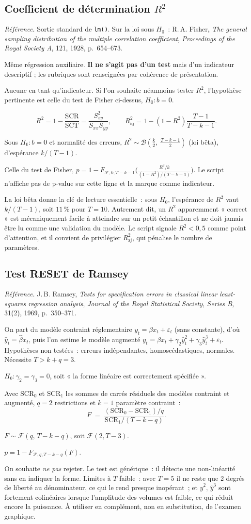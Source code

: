\documentclass[a4paper,11pt]{article}
\newcommand{\code}[1]{\texttt{\small #1}}
\newcommand{\refl}[1]{{\small\textcolor{maincolor!70!black}{\textit{Référence.} #1}}\par\smallskip}
\newcounter{ficheid}
\newenvironment{fiche}[1]{%
  \stepcounter{ficheid}%
  \phantomsection
  \subsection{#1}%
  \label{fiche:\theficheid}%
}{%
  \end{description}\vspace{0.5em}%
}
\newcommand{\Cadre}{%
  \begin{description}[leftmargin=0pt, style=unboxed, itemsep=3pt, topsep=3pt, parsep=2pt]%
  \item[\textcolor{financeblue}{\textbf{1. Cadre, notations et hypothèses de validité (non testées).}}]}
\newcommand{\Hzero}{\item[\textcolor{financeblue}{\textbf{2. Hypothèse nulle.}}]}
\newcommand{\Stat}{\item[\textcolor{financeblue}{\textbf{3. Statistique de test.}}]}
\newcommand{\Loi}{\item[\textcolor{financeblue}{\textbf{4. Loi sous $H_0$.}}]}
\newcommand{\Pval}{\item[\textcolor{financeblue}{\textbf{5. p-value.}}]}
\newcommand{\Usage}{\item[\textcolor{financeblue}{\textbf{6. Usage et limites.}}]}
\begin{document}
\begin{fiche}{Coefficient de détermination $R^2$}
\refl{Sortie standard de \code{lm()}. Sur la loi sous $H_0$~: R.\,A. Fisher, \emph{The general
sampling distribution of the multiple correlation coefficient}, \emph{Proceedings of the Royal
Society A}, 121, 1928, p.~654--673.}
\Cadre
Même régression auxiliaire. \textbf{Il ne s'agit pas d'un test} mais d'un indicateur descriptif ;
les rubriques sont renseignées par cohérence de présentation.
\Hzero
Aucune en tant qu'indicateur. Si l'on souhaite néanmoins tester $R^2$, l'hypothèse pertinente est
celle du test de Fisher ci-dessus, $H_0 : b = 0$.
\Stat
\[
  R^2 = 1 - \frac{\mathrm{SCR}}{\mathrm{SCT}} = \frac{S_{xy}^2}{S_{xx}S_{yy}},
  \qquad
  R^2_{\text{aj}} = 1 - (1-R^2)\frac{T-1}{T-k-1}.
\]
\Loi
Sous $H_0 : b = 0$ et normalité des erreurs,
$R^2 \sim \mathcal{B}\!\left(\tfrac{k}{2},\ \tfrac{T-k-1}{2}\right)$ (loi bêta), d'espérance
$k/(T-1)$.
\Pval
Celle du test de Fisher,
$p = 1 - F_{\mathcal{F},k,T-k-1}\!\big(\tfrac{R^2/k}{(1-R^2)/(T-k-1)}\big)$.
Le script n'affiche pas de p-value sur cette ligne et la marque comme indicateur.
\Usage
La loi bêta donne la clé de lecture essentielle~: sous $H_0$, l'espérance de $R^2$ vaut
$k/(T-1)$, soit $11\,\%$ pour $T=10$. Autrement dit, un $R^2$ apparemment « correct » est
mécaniquement facile à atteindre sur un petit échantillon et ne doit jamais être lu comme une
validation du modèle. Le script signale $R^2 < 0{,}5$ comme point d'attention, et il convient de
privilégier $R^2_{\text{aj}}$, qui pénalise le nombre de paramètres.
\end{fiche}

\begin{fiche}{Test RESET de Ramsey}
\refl{J.\,B. Ramsey, \emph{Tests for specification errors in classical linear least-squares
regression analysis}, \emph{Journal of the Royal Statistical Society, Series B}, 31(2), 1969,
p.~350--371.}
\Cadre
On part du modèle contraint réglementaire $y_t = \beta x_t + \varepsilon_t$ (sans constante),
d'où $\hat y_t = \hat\beta x_t$, puis l'on estime le modèle augmenté
$y_t = \beta x_t + \gamma_2 \hat y_t^2 + \gamma_3 \hat y_t^3 + \varepsilon_t$.
Hypothèses non testées~: erreurs indépendantes, homoscédastiques, normales. Nécessite
$T > k + q = 3$.
\Hzero
$H_0 : \gamma_2 = \gamma_3 = 0$, soit « la forme linéaire est correctement spécifiée ».
\Stat
Avec $\mathrm{SCR}_0$ et $\mathrm{SCR}_1$ les sommes de carrés résiduels des modèles contraint et
augmenté, $q = 2$ restrictions et $k = 1$ paramètre contraint~:
\[
  F \;=\; \frac{(\mathrm{SCR}_0 - \mathrm{SCR}_1)/q}{\mathrm{SCR}_1/(T-k-q)} .
\]
\Loi
$F \sim \mathcal{F}(q,\,T-k-q)$, soit $\mathcal{F}(2, T-3)$.
\Pval
$p = 1 - F_{\mathcal{F},q,T-k-q}(F)$.
\Usage
On souhaite \emph{ne pas} rejeter. Le test est générique~: il détecte une non-linéarité sans en
indiquer la forme. Limites à $T$ faible~: avec $T = 5$ il ne reste que 2 degrés de liberté au
dénominateur, ce qui le rend presque inopérant~; et $\hat y^2$, $\hat y^3$ sont fortement
colinéaires lorsque l'amplitude des volumes est faible, ce qui réduit encore la puissance. À
utiliser en complément, non en substitution, de l'examen graphique.
\end{fiche}
\end{document}
